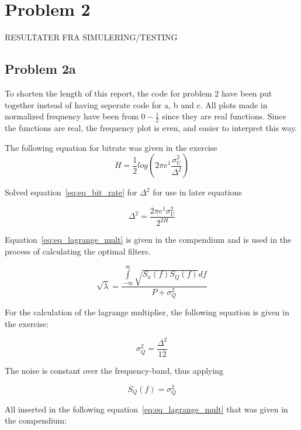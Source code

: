 \chapter{Problem 2}
RESULTATER FRA SIMULERING/TESTING

\section{Problem 2a}
	To shorten the length of this report, the code for problem 2 have been put together instead of having seperate code for a, b and c. All plots made in normalized frequency have been from $0-\frac{1}{2}$ since they are real functions. Since the functions are real, the frequency plot is even, and easier to interpret this way.
	
	
	The following equation for bitrate was given in the exercise 
	\begin{equation}
		H=\frac{1}{2}log(2\pi e^1\frac{\sigma ^2 _U}{\Delta ^2})
		\label{eq:eq_bit_rate}
	\end{equation}
	
	Solved equation~\ref{eq:eq_bit_rate} for $\Delta ^2$ for use in later equations
	
	\begin{equation}
		\Delta ^2=\frac{2\pi e^1\sigma ^2 _U}{2^{2H}}
	\end{equation}
	
	Equation~\ref{eq:eq_lagrange_mult} is given in the compendium and is used in the process of calculating the optimal filters.
	
	\begin{equation}
		\sqrt{\lambda}=\frac{\int\limits_{-\infty}^{\infty}\sqrt{S_x(f)S_Q(f)}df}{P+\sigma^2_Q}
		\label{eq:eq_lagrange_mult}
	\end{equation}
	
	For the calculation of the lagrange multiplier, the following equation is given in the exercise:
	
	\begin{equation*}
		\sigma^2_Q=\frac{\Delta^2}{12}
	\end{equation*}
	
	The noise is constant over the frequency-band, thus applying
	
	\begin{equation*}
		S_Q(f)=\sigma^2_Q
	\end{equation*}
	
	All inserted in the following equation~\ref{eq:eq_lagrange_mult} that was given in the compendium:

